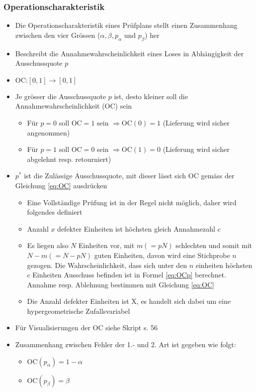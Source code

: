 \subsubsection{Operationscharakteristik}
\begin{itemize}
	\item Die Operationscharakteristik eines Prüfplans stellt einen Zusammenhang zwischen den vier Grössen ($\alpha, \beta, p_\alpha \text{ und } p_\beta$) her
	\item Beschreibt die Annahmewahrscheinlichkeit eines Loses in Abhängigkeit der Ausschussquote $p$
	\item $\text{OC:} \left[0,1\right]\rightarrow \left[0,1\right]$
	\item Je grösser die Ausschussquote $p$ ist, desto kleiner soll die Annahmewahrscheinlichkeit (OC) sein
	\begin{itemize}
		\item Für $p=0$ soll $\text{OC}=1$ sein $\Rightarrow \text{OC}(0)=1$ (Lieferung wird sicher angenommen)
		\item Für $p=1$ soll $\text{OC}=0$ sein $\Rightarrow \text{OC}(1)=0$ (Lieferung wird sicher abgelehnt resp. retourniert)
	\end{itemize}
	\item $p^\ast$ ist die Zulässige Ausschussquote, mit dieser lässt sich OC gemäss der Gleichung \ref{eq:OC} ausdrücken
	\begin{itemize}
		\item Eine Vollständige Prüfung ist in der Regel nicht möglich, daher wird folgendes definiert
		\item Anzahl $x$ defekter Einheiten ist höchsten gleich Annahmezahl $c$
		\item Es liegen also $N$ Einheiten vor, mit $m (=pN)$ schlechten und somit mit $N-m (=N-pN)$ guten Einheiten, davon wird eine Stichprobe $n$ gezogen. Die Wahrscheinlichkeit, dass sich unter den $n$ einheiten höchsten $c$ Einheiten Ausschuss befinden ist in Formel \ref{eq:OCp} berechnet. Annahme resp. Ablehnung bestimmen mit Gleichung \ref{eq:OC}
		\item Die Anzahl defekter Einheiten ist X, es handelt sich dabei um eine hypergeometrische Zufallsvariabel
	\end{itemize}
	\item Für Visualisierungen der OC siehe Skript s. 56
	\item Zusammenhang zwischen Fehler der 1.- und 2. Art ist gegeben wie folgt:
	\begin{itemize}
		\item $\text{OC}(p_\alpha) = 1-\alpha$
		\item $\text{OC}(p_\beta) = \beta$
	\end{itemize}
\end{itemize}
